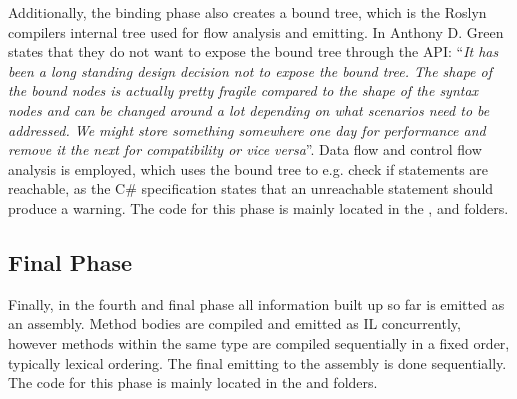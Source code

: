 Additionally, the binding phase also creates a bound tree, which is the Roslyn compilers internal tree used for flow analysis and emitting. In \cite{roslynBinder} Anthony D. Green states that they do not want to expose the bound tree through the \ac{API}: ``\textit{It has been a long standing design decision not to expose the bound tree. The shape of the bound nodes is actually pretty fragile compared to the shape of the syntax nodes and can be changed around a lot depending on what scenarios need to be addressed. We might store something somewhere one day for performance and remove it the next for compatibility or vice versa}''. 
Data flow and control flow analysis is employed, which uses the bound tree to e.g. check if statements are reachable, as the C\# specification states that an unreachable statement should produce a warning\cite{gafter2011}. The code for this phase is mainly located in the ,  and  folders.

\subsection{Final Phase}
Finally, in the fourth and final phase all information built up so far is emitted as an assembly. Method bodies are compiled and emitted as IL concurrently, however methods within the same type are compiled sequentially in a fixed order, typically lexical ordering. The final emitting to the assembly is done sequentially.\cite{sadovRoslynPerf} The code for this phase is mainly located in the  and  folders.

